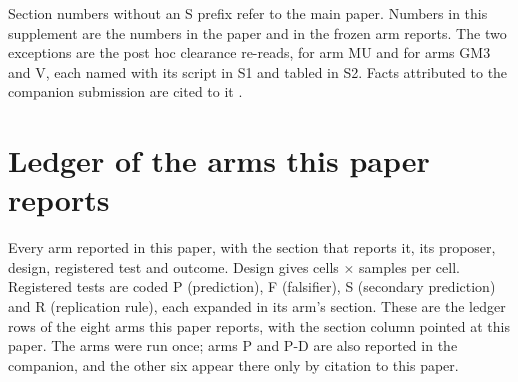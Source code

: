 Section numbers without an S prefix refer to the main paper. Numbers in this supplement are the numbers in
the paper and in the frozen arm reports. The two exceptions are the post hoc clearance
re-reads, for arm MU and for arms GM3 and V, each named with its script in S1 and tabled in
S2. Facts attributed to the
companion submission are cited to it \citep{companion}.

\section{Ledger of the arms this paper reports}\label{supp:arms}

Every arm reported in this paper, with the section that reports it, its proposer, design,
registered test and outcome. Design gives cells $\times$ samples per cell. Registered tests
are coded P (prediction), F (falsifier), S (secondary prediction) and R (replication rule),
each expanded in its arm's section. These are the ledger rows of the eight arms this paper
reports, with the section column pointed at this paper. The arms were run once; arms P and P-D
are also reported in the companion, and the other six appear there only by citation to this
paper.

